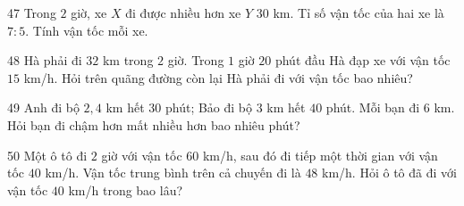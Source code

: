 \gap
\begin{probbox}{47}{}
Trong $2$ giờ, xe $X$ đi được nhiều hơn xe $Y$ $30$ km. Tỉ số vận tốc của hai xe là $7:5$. Tính vận tốc mỗi xe.
\end{probbox}
\gap
\begin{probbox}{48}{}
Hà phải đi $32$ km trong $2$ giờ. Trong $1$ giờ $20$ phút đầu Hà đạp xe với vận tốc $15$ km/h. Hỏi trên quãng đường còn lại Hà phải đi với vận tốc bao nhiêu?
\end{probbox}
\gap
\begin{probbox}{49}{}
Anh đi bộ $2{,}4$ km hết $30$ phút; Bảo đi bộ $3$ km hết $40$ phút. Mỗi bạn đi $6$ km. Hỏi bạn đi chậm hơn mất nhiều hơn bao nhiêu phút?
\end{probbox}
\gap
\begin{probbox}{50}{}
Một ô tô đi $2$ giờ với vận tốc $60$ km/h, sau đó đi tiếp một thời gian với vận tốc $40$ km/h. Vận tốc trung bình trên cả chuyến đi là $48$ km/h. Hỏi ô tô đã đi với vận tốc $40$ km/h trong bao lâu?
\end{probbox}
